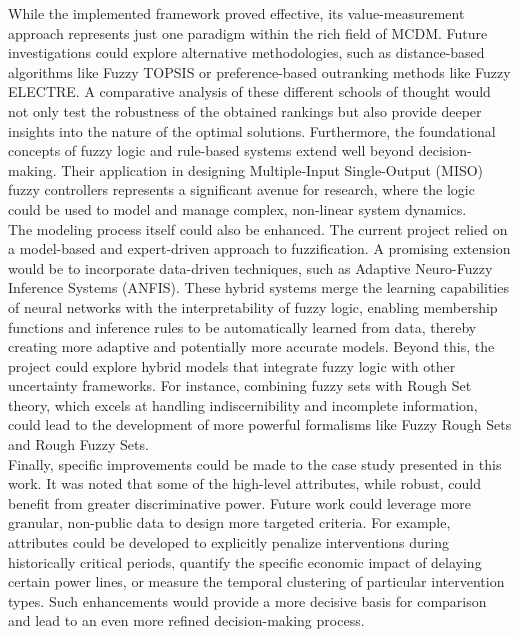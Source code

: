 While the implemented framework proved effective, its value-measurement approach represents just one paradigm within the rich field of MCDM. Future investigations could explore alternative methodologies, such as distance-based algorithms like Fuzzy TOPSIS or preference-based outranking methods like Fuzzy ELECTRE. A comparative analysis of these different schools of thought would not only test the robustness of the obtained rankings but also provide deeper insights into the nature of the optimal solutions. Furthermore, the foundational concepts of fuzzy logic and rule-based systems extend well beyond decision-making. Their application in designing Multiple-Input Single-Output (MISO) fuzzy controllers represents a significant avenue for research, where the logic could be used to model and manage complex, non-linear system dynamics.\\

The modeling process itself could also be enhanced. The current project relied on a model-based and expert-driven approach to fuzzification. A promising extension would be to incorporate data-driven techniques, such as Adaptive Neuro-Fuzzy Inference Systems (ANFIS). These hybrid systems merge the learning capabilities of neural networks with the interpretability of fuzzy logic, enabling membership functions and inference rules to be automatically learned from data, thereby creating more adaptive and potentially more accurate models. Beyond this, the project could explore hybrid models that integrate fuzzy logic with other uncertainty frameworks. For instance, combining fuzzy sets with Rough Set theory, which excels at handling indiscernibility and incomplete information, could lead to the development of more powerful formalisms like Fuzzy Rough Sets and Rough Fuzzy Sets.\\

Finally, specific improvements could be made to the case study presented in this work. It was noted that some of the high-level attributes, while robust, could benefit from greater discriminative power. Future work could leverage more granular, non-public data to design more targeted criteria. For example, attributes could be developed to explicitly penalize interventions during historically critical periods, quantify the specific economic impact of delaying certain power lines, or measure the temporal clustering of particular intervention types. Such enhancements would provide a more decisive basis for comparison and lead to an even more refined decision-making process.

